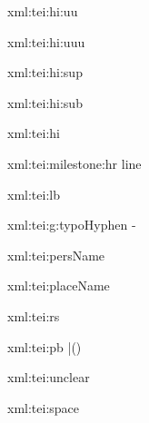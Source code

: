 \startxmlsetups xml:tei:hi:uu
\stopxmlsetups

\startxmlsetups xml:tei:hi:uuu
\stopxmlsetups

\startxmlsetups xml:tei:hi:sup
\stopxmlsetups

\startxmlsetups xml:tei:hi:sub
\stopxmlsetups

\startxmlsetups xml:tei:hi
\stopxmlsetups

\startxmlsetups xml:tei:milestone:hr
	\crlf
	line
	\crlf
\stopxmlsetups

\startxmlsetups xml:tei:lb
		{\crlf}
		{}%
\stopxmlsetups

\startxmlsetups xml:tei:g:typoHyphen
	-
\stopxmlsetups

\startxmlsetups xml:tei:persName
\stopxmlsetups

\startxmlsetups xml:tei:placeName
\stopxmlsetups

\startxmlsetups xml:tei:rs
\stopxmlsetups

\startxmlsetups xml:tei:pb
	|()
\stopxmlsetups

\startxmlsetups xml:tei:unclear
	\FSBlfloor{}\FSBrceil
\stopxmlsetups

\startxmlsetups xml:tei:space
	 \FSBlfloor\ \FSBrceil
\stopxmlsetups

